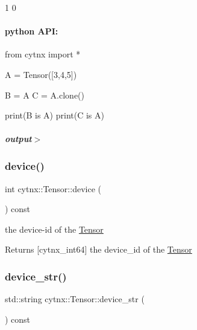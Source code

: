 \begin{DoxyVerbInclude}
1
0
\end{DoxyVerbInclude}
 \paragraph*{python A\+PI\+:}


\begin{DoxyCodeInclude}
\textcolor{keyword}{from} cytnx \textcolor{keyword}{import} *

A = Tensor([3,4,5])

B = A
C = A.clone()

print(B \textcolor{keywordflow}{is} A)
print(C \textcolor{keywordflow}{is} A)

\end{DoxyCodeInclude}
 \subparagraph*{output$>$}


\begin{DoxyVerbInclude}
\end{DoxyVerbInclude}
 \mbox{\label{classcytnx_1_1Tensor_ac6d3310eb4defbdacf662dcd81d8fe09}} 
\subsubsection{\texorpdfstring{device()}{device()}}
{\footnotesize\ttfamily int cytnx\+::\+Tensor\+::device (\begin{DoxyParamCaption}{ }\end{DoxyParamCaption}) const\hspace{0.3cm}{\ttfamily [inline]}}



the device-\/id of the \hyperlink{classcytnx_1_1Tensor}{Tensor} 

\begin{DoxyReturn}{Returns}
\mbox{[}cytnx\+\_\+int64\mbox{]} the device\+\_\+id of the \hyperlink{classcytnx_1_1Tensor}{Tensor} 
\end{DoxyReturn}
\mbox{\label{classcytnx_1_1Tensor_a335f7625fa01784f49b2223238d0c14e}} 
\subsubsection{\texorpdfstring{device\+\_\+str()}{device\_str()}}
{\footnotesize\ttfamily std\+::string cytnx\+::\+Tensor\+::device\+\_\+str (\begin{DoxyParamCaption}{ }\end{DoxyParamCaption}) const\hspace{0.3cm}{\ttfamily [inline]}}



